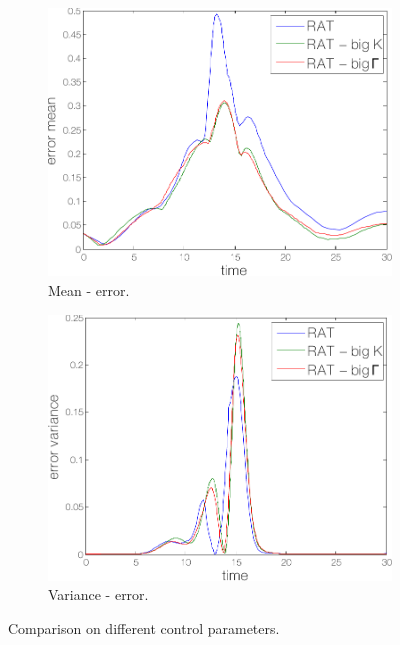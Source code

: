 \begin{figure}
\centering
\begin{subfigure}{0.4\linewidth}
\includegraphics[width=\linewidth]{./images/rat_par_mean}
\caption{Mean - error.}
\label{fig:rat:sims1:mean}
\end{subfigure}
\begin{subfigure}{0.4\linewidth}
\includegraphics[width=\linewidth]{./images/rat_par_var}
\caption{Variance - error.}
\label{fig:rat:sims1:var}
\end{subfigure}
\caption{Comparison on different control parameters.}
\label{fig:rat:sims1}
\end{figure}

